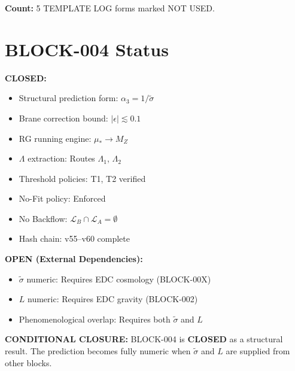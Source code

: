 \documentclass[11pt,a4paper]{article}
\theoremstyle{definition}
\begin{document}
\textbf{Count:} 5 TEMPLATE LOG forms marked NOT USED.

\section{BLOCK-004 Status}
\label{sec:status}

\begin{statusbox}
\textbf{CLOSED:}
\begin{itemize}
  \item[$\checkmark$] Structural prediction form: $\alpha_3 = 1/\tilde{\sigma}$
  \item[$\checkmark$] Brane correction bound: $|\epsilon| \lesssim 0.1$
  \item[$\checkmark$] RG running engine: $\mu_* \to M_Z$
  \item[$\checkmark$] $\Lambda$ extraction: Routes $\Lambda_1$, $\Lambda_2$
  \item[$\checkmark$] Threshold policies: T1, T2 verified
  \item[$\checkmark$] No-Fit policy: Enforced
  \item[$\checkmark$] No Backflow: $\mathcal{L}_B \cap \mathcal{L}_A = \emptyset$
  \item[$\checkmark$] Hash chain: v55--v60 complete
\end{itemize}

\textbf{OPEN (External Dependencies):}
\begin{itemize}
  \item[$\circ$] $\tilde{\sigma}$ numeric: Requires EDC cosmology (BLOCK-00X)
  \item[$\circ$] $L$ numeric: Requires EDC gravity (BLOCK-002)
  \item[$\circ$] Phenomenological overlap: Requires both $\tilde{\sigma}$ and $L$
\end{itemize}

\textbf{CONDITIONAL CLOSURE:}
BLOCK-004 is \textbf{CLOSED} as a structural result.
The prediction becomes fully numeric when $\tilde{\sigma}$ and $L$ are supplied
from other blocks.
\end{statusbox}

\end{document}
